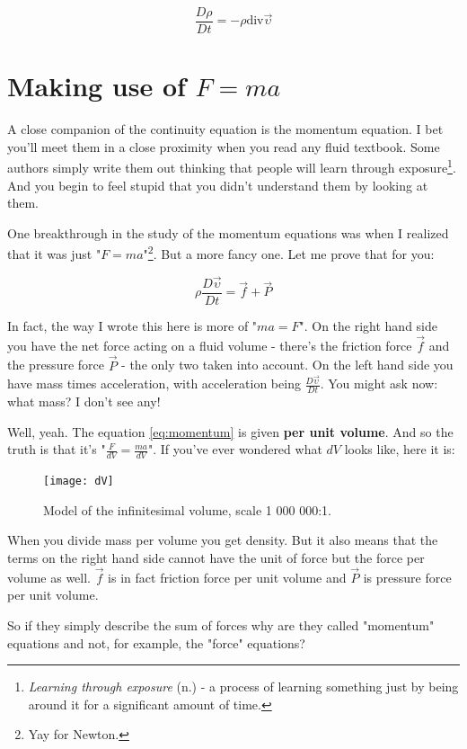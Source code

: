 \documentclass[12pt]{report}
\begin{document}
\begin{equation}
\frac{D \rho}{D t} = - \rho \text{div} \vec{\upsilon}
\end{equation}

\section{Making use of $F = ma$} \label{chap:momentum}

A close companion of the continuity equation is the momentum equation. I bet you'll meet them in a close proximity when you read any fluid textbook. Some authors simply write them out thinking that people will learn through exposure\footnote{\textit{Learning through exposure} (n.) - a process of learning something just by being around it for a significant amount of time.}. And you begin to feel stupid that you didn't understand them by looking at them.

One breakthrough in the study of the momentum equations was when I realized that it was just "$F=ma$"\footnote{Yay for Newton.}. But a more fancy one. Let me prove that for you:

\begin{equation}
\rho \frac{D \vec{\upsilon}}{Dt} = \vec{f} + \vec{P}
\label{eq:momentum}
\end{equation}

In fact, the way I wrote this here is more of "$ma=F$". On the right hand side you have the net force acting on a fluid volume - there's the friction force $\vec{f}$ and the pressure force $\vec{P}$ - the only two taken into account. On the left hand side you have mass times acceleration, with acceleration being $\frac{D \vec{\upsilon}}{Dt}$. You might ask now: what mass? I don't see any! 

Well, yeah. The equation \ref{eq:momentum} is given \textbf{per unit volume}. And so the truth is that it's "$\frac{F}{dV} = \frac{ma}{dV}$". If you've ever wondered what $dV$ looks like, here it is:

\begin{figure}[H]
\centering\texttt{[image: dV]}
\caption{Model of the infinitesimal volume, scale 1 000 000:1.}			
\label{fig:infinitesimals}
\end{figure}


When you divide mass per volume you get density. But it also means that the terms on the right hand side cannot have the unit of force but the force per volume as well. $\vec{f}$ is in fact friction force per unit volume and $\vec{P}$ is pressure force per unit volume.



So if they simply describe the sum of forces why are they called "momentum" equations and not, for example, the "force" equations?




\newpage

\begin{thebibliography}{50}



\end{thebibliography}
\end{document}
